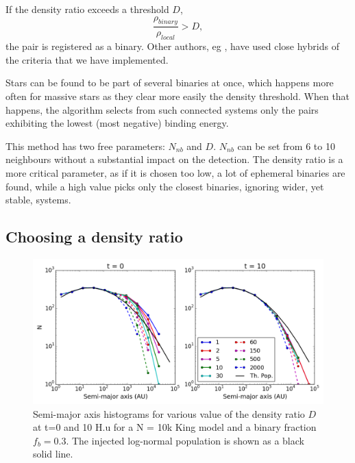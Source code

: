 If the density ratio exceeds a threshold $D$, 
\begin{equation}
\label{Eq:density_ratio}
\frac{ \rho_{binary} }{ \rho_{local} } > D,
\end{equation}
the pair is registered as a binary.  Other authors, eg \cite{Parker2009,Lomax2015}, have used close hybrids of the criteria that we have implemented.

Stars can be found to be part of several binaries at once, which happens more often for massive stars as they clear more easily the density threshold. When that happens, the algorithm selects from such connected systems only the pairs exhibiting the lowest (most negative) binding energy.

This method has two free parameters: $N_{nb}$ and $D$. $N_{nb}$ can be set from 6 to 10 neighbours without a substantial impact on the detection. The density ratio is a more critical parameter, as if it is chosen too low, a lot of ephemeral binaries are found, while a high value picks only the closest binaries, ignoring wider, yet stable, systems.



\subsection{Choosing a density ratio}



\begin{figure}
\begin{center}
\includegraphics[width=\textwidth]{Figures/5_sm_ratios}
\caption{Semi-major axis histograms for various value of the density ratio $D$ at t=0 and 10 H.u for a N = 10k King model and a binary fraction $f_b =0.3$. The injected log-normal population is shown as a black solid line.}
\label{Fig:5_sm_ratios}
\end{center}
\end{figure}



